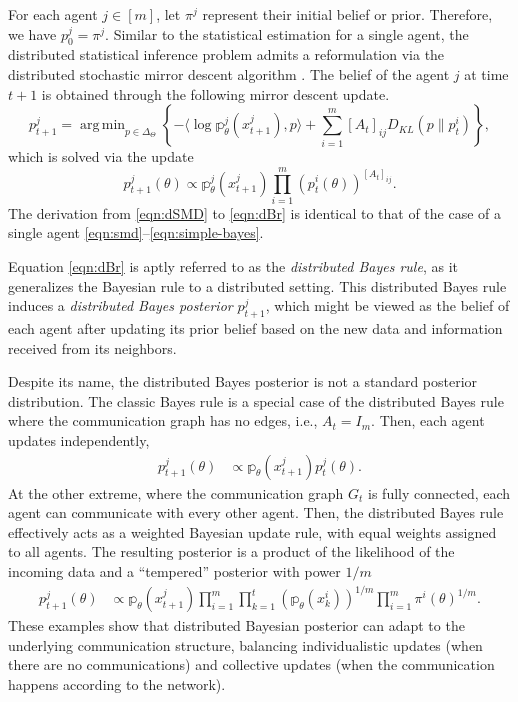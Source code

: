 \documentclass[twoside,11pt]{article}
\numberwithin{equation}{section}
\newcommand\bp{\mathbb{p}}
\DeclareMathOperator*{\argmin}{arg\,min}
\begin{document}
{For each agent $j \in [m]$, let $\pi^j$ represent their initial belief or prior. Therefore, we have $p_0^j = \pi^j$. Similar to the statistical estimation for a single agent, the distributed statistical inference problem admits a reformulation via the distributed stochastic mirror descent algorithm \citep{Uribe2022-1, Uribe2022-2}.  The belief of the agent $j$ at time $t + 1$ is obtained through the following mirror descent update. 
\begin{equation}
\label{eqn:dSMD}
        p_{t+1}^j = \argmin_{p \in \Delta_\Theta} \left\{  -\langle \log \bp_\theta^j(x_{t+1}^j), p \rangle + \sum_{i  = 1}^m [A_t]_{ij} D_{KL}(p \parallel p_t^i) \right\}, 
\end{equation}
which is solved via the update
\begin{equation}
\label{eqn:dBr}
p_{t+1}^j(\theta) \propto \bp_\theta^j(x_{t+1}^j)\prod_{i = 1}^m (p_t^i(\theta))^{[A_t]_{ij}}. 
\end{equation}
The derivation from \eqref{eqn:dSMD} to \eqref{eqn:dBr} is identical to that of the case of a single agent \eqref{eqn:smd}--\eqref{eqn:simple-bayes}. 


Equation \eqref{eqn:dBr} is aptly referred to as the \textit{distributed Bayes rule}, as it generalizes the Bayesian rule to a distributed setting. This distributed Bayes rule induces a \textit{distributed Bayes posterior} $p_{t+1}^j$, which might be viewed as the belief of each agent after updating its prior belief based on the new data and information received from its neighbors. 

Despite its name, the distributed Bayes posterior is not a standard posterior distribution. The classic Bayes rule is a special case of the distributed Bayes rule where the communication graph has no edges, i.e., $A_t = I_m$. Then, each agent updates independently, 
\begin{equation*}
    \begin{aligned}
        p_{t + 1}^j(\theta) 
        &\propto  \bp_\theta(x_{t + 1}^j)p_t^j(\theta). 
    \end{aligned}
\end{equation*}
At the other extreme, where the communication graph $G_t$ is fully connected, each agent can communicate with every other agent. Then, the distributed Bayes rule effectively acts as a weighted Bayesian update rule, with equal weights assigned to all agents. The resulting posterior
is a product of the likelihood of the incoming data and a ``tempered'' posterior with power $1/m$
\begin{equation*}
    \begin{aligned}
        p_{t + 1}^j(\theta) 
        &\propto  \bp_\theta(x_{t+1}^j) \prod_{i = 1}^m \prod_{k = 1}^t (\bp_\theta(x_k^i))^{1/m} \prod_{i = 1}^m \pi^i(\theta)^{1/m}. 
    \end{aligned}
\end{equation*}
These examples show that distributed Bayesian posterior can adapt to the underlying communication structure, balancing individualistic updates (when there are no communications) and collective updates (when the communication happens according to the network).

}
\end{document}
